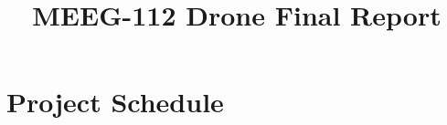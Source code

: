 \documentclass[12pt,oneside,letterpaper,english]{article}
\title{MEEG-112 Drone Final Report} %
\begin{document}
\doublespacing
{} 

\begin{singlespace}
    
\end{singlespace}


\newpage
{} 

\newpage
{}
 

\section{Project Schedule} \label{ch1}
 


\end{document}
